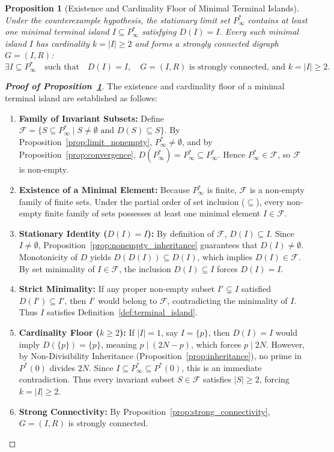 \documentclass[11pt,a4paper]{article}
\newtheorem{proposition}[theorem]{Proposition}
\theoremstyle{definition}
\begin{document}
\begin{proposition}[Existence and Cardinality Floor of Minimal Terminal Islands]
\label{prop:minimal_island}
Under the counterexample hypothesis, the stationary limit set $P^*_\infty$ contains at least one minimal terminal island $I \subseteq P^*_\infty$ satisfying $D(I) = I$. Every such minimal island $I$ has cardinality $k = |I| \ge 2$ and forms a strongly connected digraph $G = (I, R)$:
\[
\exists I \subseteq P^*_\infty \quad \text{such that} \quad D(I) = I, \quad G = (I, R) \text{ is strongly connected, and } k = |I| \ge 2.
\]
\end{proposition}
\begin{proof}[\textbf{Proof of Proposition~\ref{prop:minimal_island}}]
The existence and cardinality floor of a minimal terminal island are established as follows:
\begin{enumerate}
    \item \textbf{Family of Invariant Subsets:} Define $\mathcal{F} = \{ S \subseteq P^*_\infty \mid S \neq \emptyset \text{ and } D(S) \subseteq S \}$. By Proposition~\ref{prop:limit_nonempty}, $P^*_\infty \neq \emptyset$, and by Proposition~\ref{prop:convergence}, $D(P^*_\infty) = P^*_\infty \subseteq P^*_\infty$. Hence $P^*_\infty \in \mathcal{F}$, so $\mathcal{F}$ is non-empty.
    \item \textbf{Existence of a Minimal Element:} Because $P^*_\infty$ is finite, $\mathcal{F}$ is a non-empty family of finite sets. Under the partial order of set inclusion ($\subseteq$), every non-empty finite family of sets possesses at least one minimal element $I \in \mathcal{F}$.
    \item \textbf{Stationary Identity ($D(I) = I$):} By definition of $\mathcal{F}$, $D(I) \subseteq I$. Since $I \neq \emptyset$, Proposition~\ref{prop:nonempty_inheritance} guarantees that $D(I) \neq \emptyset$. Monotonicity of $D$ yields $D(D(I)) \subseteq D(I)$, which implies $D(I) \in \mathcal{F}$. By set minimality of $I \in \mathcal{F}$, the inclusion $D(I) \subseteq I$ forces $D(I) = I$.
    \item \textbf{Strict Minimality:} If any proper non-empty subset $I' \subsetneq I$ satisfied $D(I') \subseteq I'$, then $I'$ would belong to $\mathcal{F}$, contradicting the minimality of $I$. Thus $I$ satisfies Definition~\ref{def:terminal_island}.
    \item \textbf{Cardinality Floor ($k \ge 2$):} If $|I| = 1$, say $I = \{p\}$, then $D(I) = I$ would imply $D(\{p\}) = \{p\}$, meaning $p \mid (2N - p)$, which forces $p \mid 2N$. However, by Non-Divisibility Inheritance (Proposition~\ref{prop:inheritance}), no prime in $P^*(0)$ divides $2N$. Since $I \subseteq P^*_\infty \subseteq P^*(0)$, this is an immediate contradiction. Thus every invariant subset $S \in \mathcal{F}$ satisfies $|S| \ge 2$, forcing $k = |I| \ge 2$.
    \item \textbf{Strong Connectivity:} By Proposition~\ref{prop:strong_connectivity}, $G = (I, R)$ is strongly connected.
\end{enumerate}
\end{proof}
\end{document}
